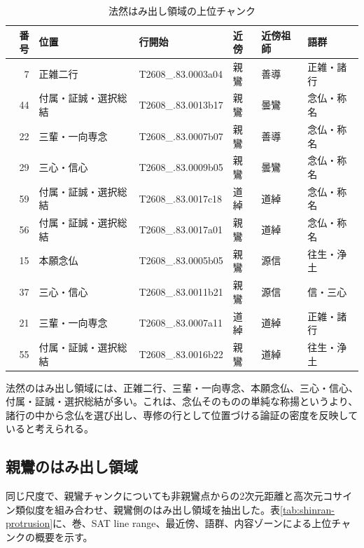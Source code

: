 \documentclass[uplatex,dvipdfmx,11pt,a4paper]{jsarticle}
\begin{document}
\begin{table}[H]
\centering
\small
\caption{法然はみ出し領域の上位チャンク}
\label{tab:honen-protrusion}
\begin{tabular}{@{}rlllll@{}}
\toprule
番号 & 位置 & 行開始 & 近傍 & 近傍祖師 & 語群 \\
\midrule
7 & 正雑二行 & T2608\_.83.0003a04 & 親鸞 & 善導 & 正雑・諸行 \\
44 & 付属・証誠・選択総結 & T2608\_.83.0013b17 & 親鸞 & 曇鸞 & 念仏・称名 \\
22 & 三輩・一向専念 & T2608\_.83.0007b07 & 親鸞 & 善導 & 念仏・称名 \\
29 & 三心・信心 & T2608\_.83.0009b05 & 親鸞 & 曇鸞 & 念仏・称名 \\
59 & 付属・証誠・選択総結 & T2608\_.83.0017c18 & 道綽 & 道綽 & 念仏・称名 \\
56 & 付属・証誠・選択総結 & T2608\_.83.0017a01 & 親鸞 & 道綽 & 念仏・称名 \\
15 & 本願念仏 & T2608\_.83.0005b05 & 親鸞 & 源信 & 往生・浄土 \\
37 & 三心・信心 & T2608\_.83.0011b21 & 親鸞 & 源信 & 信・三心 \\
21 & 三輩・一向専念 & T2608\_.83.0007a11 & 道綽 & 道綽 & 正雑・諸行 \\
55 & 付属・証誠・選択総結 & T2608\_.83.0016b22 & 親鸞 & 道綽 & 往生・浄土 \\
\bottomrule
\end{tabular}
\end{table}

法然のはみ出し領域には、正雑二行、三輩・一向専念、本願念仏、三心・信心、付属・証誠・選択総結が多い。これは、念仏そのものの単純な称揚というより、諸行の中から念仏を選び出し、専修の行として位置づける論証の密度を反映していると考えられる。

\subsection{親鸞のはみ出し領域}

同じ尺度で、親鸞チャンクについても非親鸞点からの2次元距離と高次元コサイン類似度を組み合わせ、親鸞側のはみ出し領域を抽出した。表\ref{tab:shinran-protrusion}に、巻、SAT line range、最近傍、語群、内容ゾーンによる上位チャンクの概要を示す。
\end{document}
